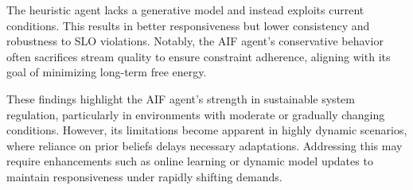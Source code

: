 The heuristic agent lacks a generative model and instead exploits current conditions. This results in better responsiveness but lower consistency and robustness to SLO violations. Notably, the AIF agent’s conservative behavior often sacrifices stream quality to ensure constraint adherence, aligning with its goal of minimizing long-term free energy.

These findings highlight the AIF agent's strength in sustainable system regulation, particularly in environments with moderate or gradually changing conditions. However, its limitations become apparent in highly dynamic scenarios, where reliance on prior beliefs delays necessary adaptations. Addressing this may require enhancements such as online learning or dynamic model updates to maintain responsiveness under rapidly shifting demands.